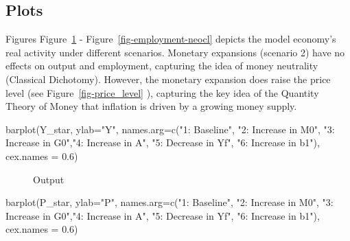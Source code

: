 \documentclass[
  letterpaper,
  DIV=11,
  numbers=noendperiod]{scrreprt}
\newenvironment{Shaded}{\begin{snugshade}}{\end{snugshade}}
\newcommand{\AttributeTok}[1]{\textcolor[rgb]{0.40,0.45,0.13}{#1}}
\newcommand{\FloatTok}[1]{\textcolor[rgb]{0.68,0.00,0.00}{#1}}
\newcommand{\FunctionTok}[1]{\textcolor[rgb]{0.28,0.35,0.67}{#1}}
\newcommand{\NormalTok}[1]{\textcolor[rgb]{0.00,0.23,0.31}{#1}}
\newcommand{\StringTok}[1]{\textcolor[rgb]{0.13,0.47,0.30}{#1}}
\begin{document}
\subsection{Plots}\label{plots}

Figures Figure~\ref{fig-output-neocl} -
Figure~\ref{fig-employment-neocl} depicts the model economy's real
activity under different scenarios. Monetary expansions (scenario 2)
have no effects on output and employment, capturing the idea of money
neutrality (Classical Dichotomy). However, the monetary expansion does
raise the price level (see Figure~\ref{fig-price_level} ), capturing the
key idea of the Quantity Theory of Money that inflation is driven by a
growing money supply.

\begin{Shaded}
\begin{Highlighting}[]
\FunctionTok{barplot}\NormalTok{(Y\_star, }\AttributeTok{ylab=}\StringTok{"Y"}\NormalTok{, }\AttributeTok{names.arg=}\FunctionTok{c}\NormalTok{(}\StringTok{"1: Baseline"}\NormalTok{, }\StringTok{"2: Increase in M0"}\NormalTok{, }\StringTok{"3: Increase in G0"}\NormalTok{,}\StringTok{"4: Increase in A"}\NormalTok{, }\StringTok{"5: Decrease in Yf"}\NormalTok{, }\StringTok{"6: Increase in b1"}\NormalTok{), }\AttributeTok{cex.names =} \FloatTok{0.6}\NormalTok{)}
\end{Highlighting}
\end{Shaded}

\begin{figure}[H]


\caption{\label{fig-output-neocl}Output}

\end{figure}%

\begin{Shaded}
\begin{Highlighting}[]
\FunctionTok{barplot}\NormalTok{(P\_star, }\AttributeTok{ylab=}\StringTok{"P"}\NormalTok{,  }\AttributeTok{names.arg=}\FunctionTok{c}\NormalTok{(}\StringTok{"1: Baseline"}\NormalTok{, }\StringTok{"2: Increase in M0"}\NormalTok{, }\StringTok{"3: Increase in G0"}\NormalTok{,}\StringTok{"4: Increase in A"}\NormalTok{, }\StringTok{"5: Decrease in Yf"}\NormalTok{, }\StringTok{"6: Increase in b1"}\NormalTok{), }\AttributeTok{cex.names =} \FloatTok{0.6}\NormalTok{)}
\end{Highlighting}
\end{Shaded}
\end{document}
